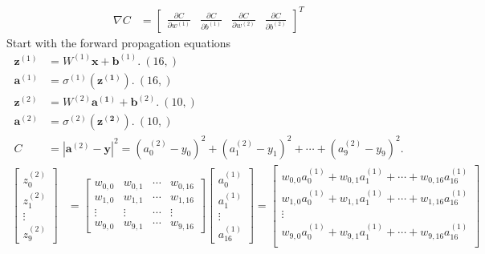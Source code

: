 \begin{align}
\nabla C &= \begin{bmatrix}
\frac{\partial C}{\partial w^{(1)}} &
\frac{\partial C}{\partial b^{(1)}} &
\frac{\partial C}{\partial w^{(2)}} &
\frac{\partial C}{\partial b^{(2)}} 
\end{bmatrix}^T
\end{align}
Start with the forward propagation equations
\begin{align}
\mathbf{z}^{(1)} &= W^{(1)} \mathbf{x} +  \mathbf{b}^{(1)}.~(16,) \\
\mathbf{a}^{(1)} &= \sigma^{(1)}(\mathbf{z^{(1)}}).~(16,) \\
\mathbf{z}^{(2)} &= W^{(2)} \mathbf{a^{(1)}} + \mathbf{b}^{(2)}.~(10,) \\
\mathbf{a}^{(2)} &= \sigma^{(2)}(\mathbf{z^{(2)}}).~(10,) \\
C &= |\mathbf{a}^{(2)} - \mathbf{y}|^2 = (a_0^{(2)} - y_0)^2 + (a_1^{(2)} - y_1)^2 + \cdots + (a_9^{(2)} - y_9)^2.
\end{align}
\begin{align}
\begin{bmatrix}
z_0^{(2)} \\
z_1^{(2)} \\
\vdots \\
z_9^{(2)} 
\end{bmatrix}
&= 
\begin{bmatrix}
w_{0,0} & w_{0,1} & \cdots & w_{0,16} \\
w_{1,0} & w_{1,1} & \cdots & w_{1,16} \\
\vdots & \vdots & \cdots & \vdots \\
w_{9,0} & w_{9,1} & \cdots & w_{9,16}
\end{bmatrix}
\begin{bmatrix}
a_0^{(1)} \\
a_1^{(1)} \\
\vdots \\
a_{16}^{(1)} 
\end{bmatrix} 
= 
\begin{bmatrix}
w_{0,0} a_0^{(1)} + w_{0,1} a_1^{(1)} + \cdots + w_{0,16} a_{16}^{(1)} \\
w_{1,0} a_0^{(1)} + w_{1,1} a_1^{(1)} + \cdots + w_{1,16} a_{16}^{(1)} \\
\vdots \\
w_{9,0} a_0^{(1)} + w_{9,1} a_1^{(1)} + \cdots + w_{9,16} a_{16}^{(1)} \\
\end{bmatrix}
\end{align}
